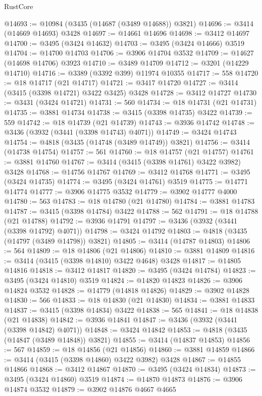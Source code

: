 \begin{lexlean}{RustCore}
\begin{coremodule}
@14693 := @10984 (@3435 (@14687 (@3489 @14688)) @3821)
@14696 := @3414 (@14669 @14693) @3428
@14697 := @14661 @14696
@14698 := @3412 @14697
@14700 := @3495 (@3424 @14632)
@14703 := @3495 (@3424 @14666) @3519
@14704 := @14700 @14703
@14706 := @3906 @14704 @3532
@14709 := @14627 (@14698 @14706) @3923
@14710 := @3489 @14709
@14712 := @3201 (@14229 @14710)
@14716 := @3389 (@3392 @399) @11974 @10355
@14717 := 558
@14720 := @18 @14717 (@21 @14717)
@14721 := @3417 @14720
@14727 := @3414 (@3415 (@3398 @14721) @3422 @3425) @3428
@14728 := @3412 @14727
@14730 := @3431 (@3424 @14721)
@14731 := 560
@14734 := @18 @14731 (@21 @14731)
@14735 := @3881 @14734
@14738 := @3415 (@3398 @14735) @3422
@14739 := 559
@14742 := @18 @14739 (@21 @14739)
@14743 := @3936 @14742
@14748 := @3436 (@3932 (@3441 (@3398 @14743) @4071))
@14749 := @3424 @14743
@14754 := @4818 (@3435 (@14748 (@3489 @14749)) @3821)
@14756 := @3414 (@14738 @14754)
@14757 := 561
@14760 := @18 @14757 (@21 @14757)
@14761 := @3881 @14760
@14767 := @3414 (@3415 (@3398 @14761) @3422 @3982) @3428
@14768 := @14756 @14767
@14769 := @3412 @14768
@14771 := @3495 (@3424 @14735)
@14774 := @3495 (@3424 @14761) @3519
@14775 := @14771 @14774
@14777 := @3906 @14775 @3532
@14779 := @3902 @14777 @4000
@14780 := 563
@14783 := @18 @14780 (@21 @14780)
@14784 := @3881 @14783
@14787 := @3415 (@3398 @14784) @3422
@14788 := 562
@14791 := @18 @14788 (@21 @14788)
@14792 := @3936 @14791
@14797 := @3436 (@3932 (@3441 (@3398 @14792) @4071))
@14798 := @3424 @14792
@14803 := @4818 (@3435 (@14797 (@3489 @14798)) @3821)
@14805 := @3414 (@14787 @14803)
@14806 := 564
@14809 := @18 @14806 (@21 @14806)
@14810 := @3881 @14809
@14816 := @3414 (@3415 (@3398 @14810) @3422 @4648) @3428
@14817 := @14805 @14816
@14818 := @3412 @14817
@14820 := @3495 (@3424 @14784)
@14823 := @3495 (@3424 @14810) @3519
@14824 := @14820 @14823
@14826 := @3906 @14824 @3532
@14828 := @14779 (@14818 @14826)
@14829 := @3902 @14828
@14830 := 566
@14833 := @18 @14830 (@21 @14830)
@14834 := @3881 @14833
@14837 := @3415 (@3398 @14834) @3422
@14838 := 565
@14841 := @18 @14838 (@21 @14838)
@14842 := @3936 @14841
@14847 := @3436 (@3932 (@3441 (@3398 @14842) @4071))
@14848 := @3424 @14842
@14853 := @4818 (@3435 (@14847 (@3489 @14848)) @3821)
@14855 := @3414 (@14837 @14853)
@14856 := 567
@14859 := @18 @14856 (@21 @14856)
@14860 := @3881 @14859
@14866 := @3414 (@3415 (@3398 @14860) @3422 @3982) @3428
@14867 := @14855 @14866
@14868 := @3412 @14867
@14870 := @3495 (@3424 @14834)
@14873 := @3495 (@3424 @14860) @3519
@14874 := @14870 @14873
@14876 := @3906 @14874 @3532
@14879 := @3902 @14876 @4667 @4665

\end{coremodule}
\end{lexlean}
